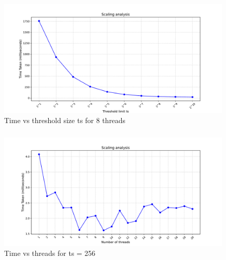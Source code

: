 \documentclass[12pt]{article}
\begin{document}
\subsection{}
\subsubsection{}
\begin{figure}[ht]
    \includegraphics[width = \textwidth]{task3_ts.pdf}
    \caption{Time vs threshold size ts for 8 threads}
    \label{fig:ts_change_task3}
\end{figure}
\clearpage
\subsubsection{}
\begin{figure}[ht]
    \includegraphics[width = \textwidth]{task3_t.pdf}
    \caption{Time vs threads for ts = 256}
    \label{fig:t_change_task3}
\end{figure}
\end{document}
